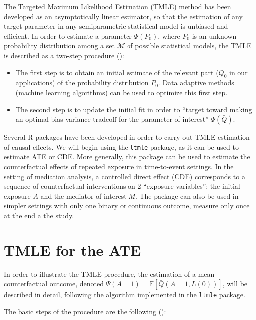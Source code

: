 \documentclass[
]{book}
\providecommand{\tightlist}{%
  \setlength{\itemsep}{0pt}\setlength{\parskip}{0pt}}
\begin{document}
The Targeted Maximum Likelihood Estimation (TMLE) method has been developed as an asymptotically linear estimator, so that the estimation of any target parameter in any semiparametric statistical model is unbiased and efficient. In order to estimate a parameter \(\Psi(P_0)\), where \(P_0\) is an unknown probability distribution among a set \(\mathcal{M}\) of possible statistical models, the TMLE is described as a two-step procedure ():

\begin{itemize}
\tightlist
\item
  The first step is to obtain an initial estimate of the relevant part (\(\bar{Q}_0\) in our applications) of the probability distribution \(P_0\). Data adaptive methods (machine learning algorithms) can be used to optimize this first step.
\item
  The second step is to update the initial fit in order to ``target toward making an optimal bias-variance tradeoff for the parameter of interest'' \(\Psi(\bar{Q})\).
\end{itemize}

Several R packages have been developed in order to carry out TMLE estimation of causal effects. We will begin using the \texttt{ltmle} package, as it can be used to estimate ATE or CDE. More generally, this package can be used to estimate the counterfactual effects of repeated exposure in time-to-event settings. In the setting of mediation analysis, a controlled direct effect (CDE) corresponds to a sequence of counterfactual interventions on 2 ``exposure variables'': the initial exposure \(A\) and the mediator of interest \(M\). The package can also be used in simpler settings with only one binary or continuous outcome, measure only once at the end a the study.

\section{TMLE for the ATE}\label{tmle-for-the-ate}

In order to illustrate the TMLE procedure, the estimation of a mean counterfactual outcome, denoted \(\Psi(A=1) = \mathbb{E} \left[\bar{Q}(A=1,L(0))\right]\), will be described in detail, following the algorithm implemented in the \texttt{ltmle} package.

The basic steps of the procedure are the following ():
\end{document}
